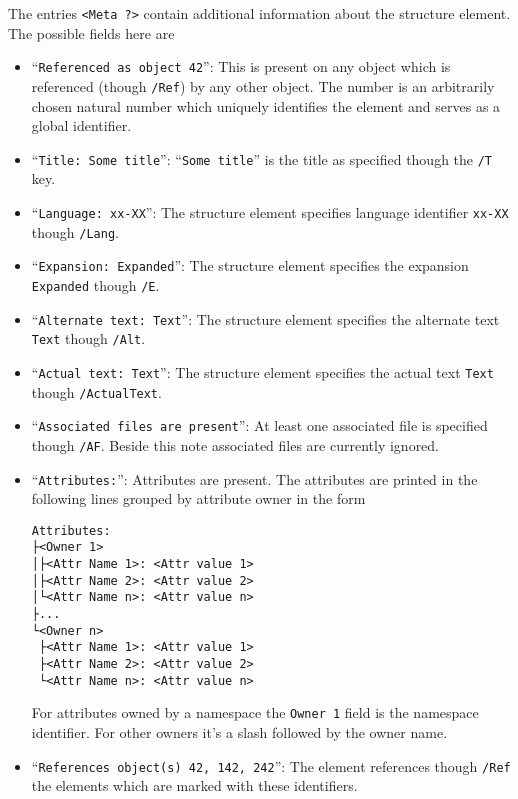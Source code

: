 \documentclass[8pt,a4paper]{article}
\begin{document}
The entries \texttt{<Meta ?>} contain additional information about the structure element.
The possible fields here are
\begin{itemize}
  \item \enquote{\texttt{Referenced as object 42}}: This is present on any object which is referenced (though \texttt{/Ref}) by any other object.
    The number is an arbitrarily chosen natural number which uniquely identifies the element and serves as a global identifier.
  \item \enquote{\texttt{Title: Some title}}: \enquote{\texttt{Some title}} is the title as specified though the \texttt{/T} key.
  \item \enquote{\texttt{Language: xx-XX}}: The structure element specifies language identifier \texttt{xx-XX} though \texttt{/Lang}.
  \item \enquote{\texttt{Expansion: Expanded}}: The structure element specifies the expansion \texttt{Expanded} though \texttt{/E}.
  \item \enquote{\texttt{Alternate text: Text}}: The structure element specifies the alternate text \texttt{Text} though \texttt{/Alt}.
  \item \enquote{\texttt{Actual text: Text}}: The structure element specifies the actual text \texttt{Text} though \texttt{/ActualText}.
  \item \enquote{\texttt{Associated files are present}}: At least one associated file is specified though \texttt{/AF}.
    Beside this note associated files are currently ignored.
  \item \enquote{\texttt{Attributes:}}: Attributes are present. The attributes are printed in the following lines grouped by attribute owner in the form
    \begin{verbatim}
Attributes:
├<Owner 1>
│├<Attr Name 1>: <Attr value 1>
│├<Attr Name 2>: <Attr value 2>
│└<Attr Name n>: <Attr value n>
├...
└<Owner n>
 ├<Attr Name 1>: <Attr value 1>
 ├<Attr Name 2>: <Attr value 2>
 └<Attr Name n>: <Attr value n>
    \end{verbatim}
    For attributes owned by a namespace the \texttt{Owner 1} field is the namespace identifier.
    For other owners it's a slash followed by the owner name.
  \item \enquote{\texttt{References object(s) 42, 142, 242}}: The element references though \texttt{/Ref} the elements which are marked with these identifiers.
\end{itemize}
\end{document}
